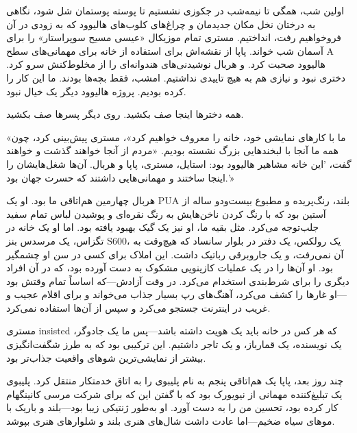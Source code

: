 اولین شب، همگی تا نیمه‌شب در جکوزی نشستیم تا پوسته پوستمان شل شود، نگاهی به درختان نخل مکان جدیدمان و چراغ‌های کلوب‌های هالیوود که به زودی در آن فروخواهیم رفت، انداختیم. مستری تمام موزیکال «عیسی مسیح سوپراستار» را برای آسمان شب خواند. پاپا از نقشه‌اش برای استفاده از خانه برای مهمانی‌های سطح A هالیوود صحبت کرد. و هربال نوشیدنی‌های هندوانه‌ای را از مخلوط‌کنش سرو کرد. دختری نبود و نیازی هم به هیچ تاییدی نداشتیم. امشب، فقط بچه‌ها بودند. ما این کار را کرده بودیم. پروژه هالیوود دیگر یک خیال نبود.

همه دخترها اینجا صف بکشید.
روی دیگر پسرها صف بکشید.

«ما با کارهای نمایشی خود، خانه را معروف خواهیم کرد»، مستری پیش‌بینی کرد، چون همه ما آنجا با لبخندهایی بزرگ نشسته بودیم. «مردم از آنجا خواهند گذشت و خواهند گفت، 'این خانه مشاهیر هالیوود بود: استایل، مستری، پاپا و هربال. آن‌ها شغل‌هایشان را اینجا ساختند و مهمانی‌هایی داشتند که حسرت جهان بود.'»

هربال چهارمین هم‌اتاقی ما بود. او یک PUA بلند، رنگ‌پریده و مطبوع بیست‌ودو ساله از آستین بود که با رنگ کردن ناخن‌هایش به رنگ نقره‌ای و پوشیدن لباس تمام سفید جلب‌توجه می‌کرد. مثل بقیه ما، او نیز یک گیک بهبود یافته بود. اما او یک خانه در تگزاس، یک مرسدس بنز S600، یک رولکس، یک دفتر در بلوار سانساد که هیچ‌وقت به آن نمی‌رفت، و یک جاروبرقی رباتیک داشت. این املاک برای کسی در سن او چشمگیر بود. او آن‌ها را در یک عملیات کازینویی مشکوک به دست آورده بود، که در آن افراد دیگری را برای شرط‌بندی استخدام می‌کرد. در وقت آزادش—که اساساً تمام وقتش بود—او غارها را کشف می‌کرد، آهنگ‌های رپ بسیار جذاب می‌خواند و برای اقلام عجیب و غریب در اینترنت جستجو می‌کرد و سپس از آن‌ها استفاده نمی‌کرد.

مستری insisted که هر کس در خانه باید یک هویت داشته باشد—پس ما یک جادوگر، یک نویسنده، یک قمارباز، و یک تاجر داشتیم. این ترکیبی بود که به طرز شگفت‌انگیزی بیشتر از نمایشی‌ترین شوهای واقعیت جذاب‌تر بود.

چند روز بعد، پاپا یک هم‌اتاقی پنجم به نام پلیبوی را به اتاق خدمتکار منتقل کرد. پلیبوی یک تبلیغ‌کننده مهمانی از نیویورک بود که با گفتن این که برای شرکت مرسی کانینگهام کار کرده بود، تحسین من را به دست آورد. او به‌طور ژنتیکی زیبا بود—بلند و باریک با موهای سیاه ضخیم—اما عادت داشت شال‌های هنری بلند و شلوارهای هنری بپوشد.